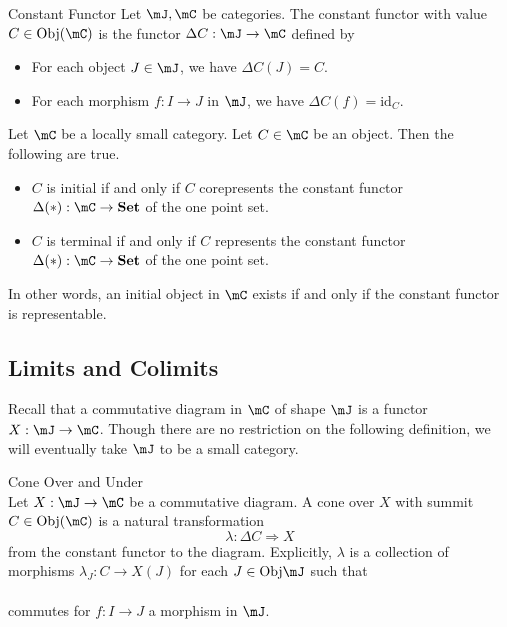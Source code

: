 \documentclass[a4paper]{article}
\begin{document}
\begin{defn}{Constant Functor}{} Let $\mJ,\mC$ be categories. The constant functor with value $C\in\text{Obj}(\mC)$ is the functor $\Delta C:\mJ\to\mC$ defined by 
\begin{itemize}
\item For each object $J\in\mJ$, we have $\Delta C(J)=C$. 
\item For each morphism $f:I\to J$ in $\mJ$, we have $\Delta C(f)=\text{id}_C$. 
\end{itemize}
\end{defn}

\begin{prp}{}{} Let $\mC$ be a locally small category. Let $C\in\mC$ be an object. Then the following are true. 
\begin{itemize}
\item $C$ is initial if and only if $C$ corepresents the constant functor $\Delta(\ast):\mC\to\bold{Set}$ of the one point set. 
\item $C$ is terminal if and only if $C$ represents the constant functor $\Delta(\ast):\mC\to\bold{Set}$ of the one point set. 
\end{itemize}
\end{prp}

In other words, an initial object in $\mC$ exists if and only if the constant functor is representable. 

\subsection{Limits and Colimits}
Recall that a commutative diagram in $\mC$ of shape $\mJ$ is a functor $X:\mJ\to\mC$. Though there are no restriction on the following definition, we will eventually take $\mJ$ to be a small category. 

\begin{defn}{Cone Over and Under}{}\\
Let $X:\mJ\to\mC$ be a commutative diagram. A cone over $X$ with summit $C\in\text{Obj}(\mC)$ is a natural transformation $$\lambda:\Delta C\Rightarrow X$$ from the constant functor to the diagram. Explicitly, $\lambda$ is a collection of morphisms $\lambda_J:C\to X(J)$ for each $J\in\text{Obj}\mJ$ such that \\
\\
commutes for $f:I\to J$ a morphism in $\mJ$. 
\end{defn}
\end{document}
